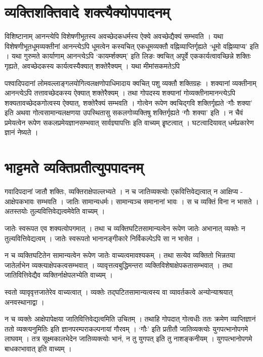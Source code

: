 \section*{व्यक्तिशक्तिवादे शक्त्यैक्योपपादनम्}

विशिष्टानाम् आनन्त्येपि विशेषणीभूतस्य अवच्छेदकधर्मस्य ऐक्ये अवच्छेद्यैक्यं सम्भवति । यथा विशेषणीभूतधूमव्यक्तीनां आनन्त्येऽपि धूमत्वेन कस्यचित् एकधूमव्यक्तौ वह्निव्याप्तिर्गृह्यते ‘धूमो वह्निव्याप्य’ इति  । यथा गुरुमते कार्याणाम् आनन्त्येऽपि ‘कायर्म्शक्यम्’ इति लिङः क्वचित् अपूर्वे एककार्यत्वावच्छिन्ने शक्तिः गृह्यते, अवच्छेदकस्य कार्यत्वस्यैक्यात् शक्तेरैक्यम् । यथा मीमांसकमतेऽपि 	

पश्वादिपदानां लोमवल्लाङ्गलयोगित्वलक्षणोपाधिमादाय क्वचित् पशु व्यक्तौ शक्तिग्रहः । शक्यानां व्यक्तीनाम् आनन्त्येऽपि तत्तावच्छेदकस्य ऐक्यात् शक्तेरैक्यम् । तथा गोपदस्य शक्यानां गोव्यक्तीनामानन्त्येऽपि शक्यतावच्छेदकगोत्वस्य ऐक्यात्, शक्तेरैक्यं सम्भवति । { गोत्वेन रूपेण क्वचिद्गवि शक्तिर्गृह्यते ‘गौः शक्या’ इति } अथवा गोत्वसामान्यलक्षणया उपस्थितासु सकलगोव्यक्तिषु शक्तिर्गृह्यते ‘गौः शक्या’ इति । न चैवं प्रमेयत्वेन रूपेण सकलप्रमेयज्ञानसम्भवात् सार्वज्ञ्यापत्तिः इति वाच्यम्  इृष्टत्वात् । घटत्वादियावत् धर्मप्रकारेण ज्ञानं नेष्यते ।

\section*{भाट्टमते व्यक्तिप्रतीत्युपपादनम्}

गवादिपदानां जातौ शक्तिः, व्यक्तिराक्षेपाल्लभ्यते । न च जातिव्यक्त्योः एकवित्तिवेद्यत्वात् न आक्षिप्य - आक्षेपकभावः सम्भवति । जातिः सामान्यधर्मः। सामान्यञ्च समानानां भावः । स च व्यक्तिं विना न भासते । अतस्तयोः तुल्यवित्तिवेद्यत्वमेवेति वाच्यम् ।

जातेः स्वरूपत एव शक्यत्वोपगमात् । तथा च व्यक्तिघटितसामान्यत्वेन रूपेण जातेः अभानात् व्यक्तेः न तुल्यवित्तिवेद्यत्वम् । जातेः स्वरूपतो भानानङ्गीकारे  निर्विकल्पेऽपि सा न भासेत ।

न च व्यक्तिघटितेन सामान्यत्वेन रूपेण जातेः वाच्यत्वमावश्यकम् । तथा सत्येव व्यक्तितो भिन्नतया जातेर्लाभेन व्यक्त्याक्षेपकत्वसम्भवात् । व्यावृत्तत्वबुद्धिमन्तरा व्यक्तिविशेषाक्षेपकतासम्भवात् । तथा जातिवित्तिवेद्यैव व्यक्तिर्नाक्षेपलभ्येति वाच्यम् । 

स्वतो व्यावृवृत्तजातेरेव वाच्यत्वात् । व्यक्तेः तद्घटितसामान्यत्वस्य वा व्यावर्तकत्वे अन्योन्याश्रयात्  अनवस्थानाद्वा ।

न च व्यक्तेः आक्षेपापेक्षया जातिवित्तिवेद्यत्वमिति उचितम् । तथाहि गोपदात् गोत्वधीः ततः क्रमेण व्याप्तिज्ञानं ततो व्यक्त्यनुमितिः इति ज्ञानपरम्पराकल्पनायां गौरवम् । ‘गौः’ इति प्रतीतौ जातिव्यक्त्योः युगपत्भानोपगमे लाघवम् । तत्र सूक्ष्मकालभेदेन जातिव्यक्त्योः भानं, न तु युगपत् इति तु नाशङ्कनीयम् । युगपत्भानोपगमे बाधकाभावात् इति वाच्यम् ।

